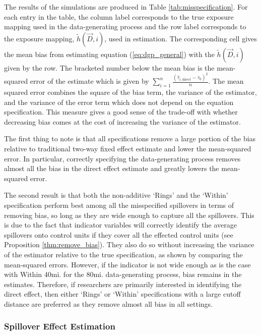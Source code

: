 \documentclass[11pt]{article}
\begin{document}
The results of the simulations are produced in Table \ref{tab:misspecification}. For each entry in the table, the column label corresponds to the true exposure mapping used in the data-generating process and the row label corresponds to the exposure mapping, $\tilde{h}(\vec{D}, i)$, used in estimation.  The corresponding cell gives the mean bias from estimating equation (\ref{eq:dgp_general}) with the $\tilde{h}(\vec{D}, i)$ given by the row. The bracketed number below the mean bias is the mean-squared error of the estimate which is given by $\sum_{i=1}^n \frac{(\hat{\tau}_{i,\text{direct}} - \tau_0)^2}{n}$. The mean squared error combines the square of the bias term, the variance of the estimator, and the variance of the error term which does not depend on the equation specification. This measure gives a good sense of the trade-off with whether decreasing bias comes at the cost of increasing the variance of the estimator.

The first thing to note is that all specifications remove a large portion of the bias relative to traditional two-way fixed effect estimate and lower the mean-squared error. In particular, correctly specifying the data-generating process removes almost all the bias in the direct effect estimate and greatly lowers the mean-squared error.  

The second result is that both the non-additive `Rings' and the `Within' specification perform best among all the misspecified spillovers in terms of removing bias, so long as they are wide enough to capture all the spillovers. This is due to the fact that indicator variables will correctly identify the average spillovers onto control units if they cover all the effected control units (see Proposition \ref{thm:remove_bias}). They also do so without increasing the variance of the estimator relative to the true specification, as shown by comparing the mean-squared errors. However, if the indicator is not wide enough as is the case with Within 40mi. for the 80mi. data-generating process, bias remains in the estimates. Therefore, if researchers are primarily interested in identifying the direct effect, then either `Rings' or `Within' specifications with a large cutoff distance are preferred as they remove almost all bias in all settings. 

\subsubsection{Spillover Effect Estimation}
\end{document}
